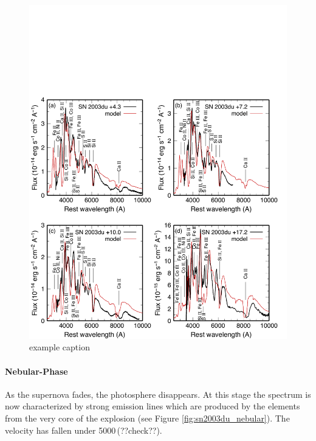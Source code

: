 \begin{figure}[htbp] %
   \centering
   \includegraphics[width=\textwidth]{chapter_intro/plots/sn2003du_t+17.pdf} 
   \caption{example caption}
   \label{fig:sn2003du_t+17}
\end{figure}


\paragraph{Nebular-Phase}
As the supernova fades, the photosphere disappears. At this stage the spectrum is now characterized by strong emission lines which are produced by the elements from the very core of the explosion (see Figure \ref{fig:sn2003du_nebular}). The velocity has fallen under 5000\,\kms (??check??). 

